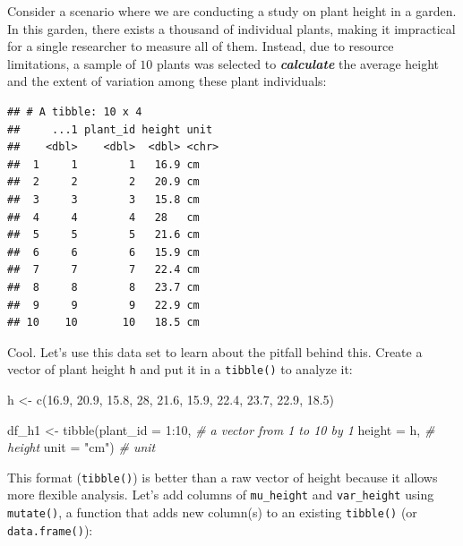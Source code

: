\documentclass[
]{article}
\newenvironment{Shaded}{\begin{snugshade}}{\end{snugshade}}
\newcommand{\AttributeTok}[1]{\textcolor[rgb]{0.77,0.63,0.00}{#1}}
\newcommand{\CommentTok}[1]{\textcolor[rgb]{0.56,0.35,0.01}{\textit{#1}}}
\newcommand{\DecValTok}[1]{\textcolor[rgb]{0.00,0.00,0.81}{#1}}
\newcommand{\FloatTok}[1]{\textcolor[rgb]{0.00,0.00,0.81}{#1}}
\newcommand{\FunctionTok}[1]{\textcolor[rgb]{0.00,0.00,0.00}{#1}}
\newcommand{\NormalTok}[1]{#1}
\newcommand{\OtherTok}[1]{\textcolor[rgb]{0.56,0.35,0.01}{#1}}
\newcommand{\SpecialCharTok}[1]{\textcolor[rgb]{0.00,0.00,0.00}{#1}}
\newcommand{\StringTok}[1]{\textcolor[rgb]{0.31,0.60,0.02}{#1}}
\begin{document}
Consider a scenario where we are conducting a study on plant height in a garden. In this garden, there exists a thousand of individual plants, making it impractical for a single researcher to measure all of them. Instead, due to resource limitations, a sample of \(10\) plants was selected to \textbf{\emph{calculate}} the average height and the extent of variation among these plant individuals:

\begin{verbatim}
## # A tibble: 10 x 4
##     ...1 plant_id height unit 
##    <dbl>    <dbl>  <dbl> <chr>
##  1     1        1   16.9 cm   
##  2     2        2   20.9 cm   
##  3     3        3   15.8 cm   
##  4     4        4   28   cm   
##  5     5        5   21.6 cm   
##  6     6        6   15.9 cm   
##  7     7        7   22.4 cm   
##  8     8        8   23.7 cm   
##  9     9        9   22.9 cm   
## 10    10       10   18.5 cm
\end{verbatim}

Cool. Let's use this data set to learn about the pitfall behind this. Create a vector of plant height \texttt{h} and put it in a \texttt{tibble()} to analyze it:

\begin{Shaded}
\begin{Highlighting}[]
\NormalTok{h }\OtherTok{\textless{}{-}} \FunctionTok{c}\NormalTok{(}\FloatTok{16.9}\NormalTok{, }\FloatTok{20.9}\NormalTok{, }\FloatTok{15.8}\NormalTok{, }\DecValTok{28}\NormalTok{, }\FloatTok{21.6}\NormalTok{, }\FloatTok{15.9}\NormalTok{, }\FloatTok{22.4}\NormalTok{, }\FloatTok{23.7}\NormalTok{, }\FloatTok{22.9}\NormalTok{, }\FloatTok{18.5}\NormalTok{)}

\NormalTok{df\_h1 }\OtherTok{\textless{}{-}} \FunctionTok{tibble}\NormalTok{(}\AttributeTok{plant\_id =} \DecValTok{1}\SpecialCharTok{:}\DecValTok{10}\NormalTok{, }\CommentTok{\# a vector from 1 to 10 by 1}
                \AttributeTok{height =}\NormalTok{ h, }\CommentTok{\# height}
                \AttributeTok{unit =} \StringTok{"cm"}\NormalTok{) }\CommentTok{\# unit}
\end{Highlighting}
\end{Shaded}

This format (\texttt{tibble()}) is better than a raw vector of height because it allows more flexible analysis. Let's add columns of \texttt{mu\_height} and \texttt{var\_height} using \texttt{mutate()}, a function that adds new column(s) to an existing \texttt{tibble()} (or \texttt{data.frame()}):
\end{document}
